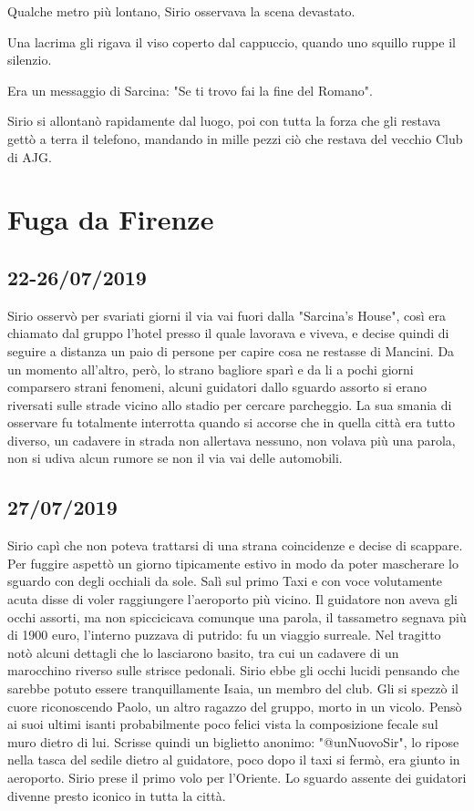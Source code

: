 Qualche metro più lontano, Sirio osservava la scena devastato.

Una lacrima gli rigava il viso coperto dal cappuccio, quando uno squillo ruppe il silenzio.

Era un messaggio di Sarcina: "Se ti trovo fai la fine del Romano".

Sirio si allontanò rapidamente dal luogo, poi con tutta la forza che gli restava gettò a terra il telefono, mandando in mille pezzi ciò che restava del vecchio Club di AJG.

\section{Fuga da Firenze}
\subsection*{22-26/07/2019}

Sirio osservò per svariati giorni il via vai fuori dalla "Sarcina's House", così era chiamato dal gruppo l'hotel presso il quale lavorava e viveva, e decise quindi di seguire a distanza un paio di persone per capire cosa ne restasse di Mancini. Da un momento all'altro, però, lo strano bagliore sparì e da li a pochi giorni comparsero strani fenomeni, alcuni guidatori dallo sguardo assorto si erano riversati sulle strade vicino allo stadio per cercare parcheggio. La sua smania di osservare fu totalmente interrotta quando si accorse che in quella città era tutto diverso, un cadavere in strada non allertava nessuno, non volava più una parola, non si udiva alcun rumore se non il via vai delle automobili.

\subsection*{27/07/2019}
Sirio capì che non poteva trattarsi di una strana coincidenze e decise di scappare. Per fuggire aspettò un giorno tipicamente estivo in modo da poter mascherare lo sguardo con degli occhiali da sole. Salì sul primo Taxi e con voce volutamente acuta disse di voler raggiungere l'aeroporto più vicino. Il guidatore non aveva gli occhi assorti, ma non spiccicicava comunque una parola, il tassametro segnava più di 1900 euro, l'interno puzzava di putrido: fu un viaggio surreale. 
Nel tragitto notò alcuni dettagli che lo lasciarono basito, tra cui un cadavere di un marocchino riverso sulle strisce pedonali. Sirio ebbe gli occhi lucidi pensando che sarebbe potuto essere tranquillamente Isaia, un membro del club. Gli si spezzò il cuore riconoscendo Paolo, un altro ragazzo del gruppo, morto in un vicolo. Pensò ai suoi ultimi isanti probabilmente poco felici vista la composizione fecale sul muro dietro di lui. Scrisse quindi un biglietto anonimo: "@unNuovoSir", lo ripose nella tasca del sedile dietro al guidatore, poco dopo il taxi si fermò, era giunto in aeroporto. Sirio prese il primo volo per l'Oriente. Lo sguardo assente dei guidatori divenne presto iconico in tutta la città.


